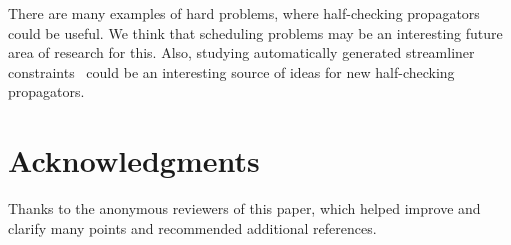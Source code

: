 \documentclass[runningheads]{llncs}
\begin{document}
There are many examples of hard problems, where half-checking
propagators could be useful. We think that scheduling problems may be
an interesting future area of research for this. Also, studying
automatically generated streamliner
constraints~\cite{Wetter15,Spracklen19} could be an interesting source
of ideas for new half-checking propagators.




\section*{Acknowledgments}
Thanks to the anonymous reviewers of this paper, which helped improve
and clarify many points and recommended additional references.



\end{document}
